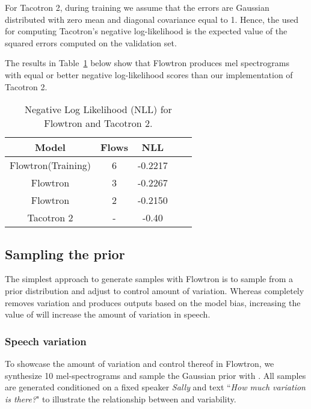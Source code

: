 \documentclass{article}
\begin{document}
For Tacotron 2, during training we assume that the errors are Gaussian distributed with zero mean and diagonal covariance equal to 1. Hence, the  used for computing Tacotron's negative log-likelihood is the expected value of the squared errors computed on the validation set.

The results in Table~\ref{tab:nll} below show that Flowtron produces mel spectrograms with equal or better negative log-likelihood scores than our implementation of Tacotron 2.

\begin{table}[!ht]
\begin{center}
    \begin{tabular}{ c|c|c|c|c}
        \textbf{Model} & \textbf{Flows} &  \textbf{NLL}\\
        \hline
        Flowtron(Training)      & 6         & -0.2217 \\
        Flowtron      & 3         & -0.2267 \\
        Flowtron      & 2         & -0.2150 \\
        Tacotron 2    & -         & -0.40 \\
        \hline
    \end{tabular}
    \caption{Negative Log Likelihood (NLL) for Flowtron and Tacotron 2.}
    \label{tab:nll}
\end{center}
\end{table}
\fi

\subsection{Sampling the prior}\label{sec:sampling_prior}
The simplest approach to generate samples with Flowtron is to sample from a prior distribution  and adjust  to control amount of variation. Whereas  completely removes variation and produces outputs based on the model bias, increasing the value of   will increase the amount of variation in speech. 

\subsubsection{Speech variation}
To showcase the amount of variation and control thereof in Flowtron, we synthesize 10 mel-spectrograms and sample the Gaussian prior with . All samples are generated conditioned on a fixed speaker \textit{Sally} and text ``\textit{How much variation is there?}" to illustrate the relationship between  and variability. 
\end{document}
